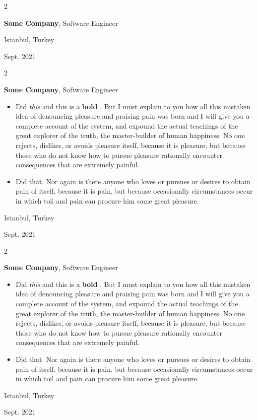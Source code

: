 \documentclass[10pt, letterpaper]{article}
\newenvironment{highlights}{
    \begin{itemize}[
        topsep=0.10 cm,
        parsep=0.10 cm,
        partopsep=0pt,
        itemsep=0pt,
        leftmargin=0.4 cm + 10pt
    ]
}{
    \end{itemize}
} %
\newenvironment{twocolentry}[2][]{
    \onecolentry
    \def\secondColumn{#2}
    \setcolumnwidth{\fill, 4.5 cm}
    \begin{paracol}{2}
}{
    \switchcolumn \raggedleft \secondColumn
    \end{paracol}
    \endonecolentry
} %
\let\hrefWithoutArrow\href
\renewcommand{\href}[2]{\hrefWithoutArrow{#1}{\mbox{\ifthenelse{\equal{#2}{}}{ }{#2 }\raisebox{.15ex}{\footnotesize \faExternalLink*}}}}
\begin{document}
        \vspace{0.2 cm}

        \begin{twocolentry}{
            Istanbul, Turkey

        Sept. 2021
        }
            \textbf{Some \textnormal{Company}}, Software Engineer
        \end{twocolentry}


        \vspace{0.2 cm}

        \begin{twocolentry}{
            Istanbul, Turkey

        Sept. 2021
        }
            \textbf{Some \textnormal{Company}}, Software Engineer
            \begin{highlights}
                \item Did \textit{this} and this is a \textbf{bold} \href{https://example.com}{link}. But I must explain to you how all this mistaken idea of denouncing pleasure and praising pain was born and I will give you a complete account of the system, and expound the actual teachings of the great explorer of the truth, the master-builder of human happiness. No one rejects, dislikes, or avoids pleasure itself, because it is pleasure, but because those who do not know how to pursue pleasure rationally encounter consequences that are extremely painful.
                \item Did that. Nor again is there anyone who loves or pursues or desires to obtain pain of itself, because it is pain, but because occasionally circumstances occur in which toil and pain can procure him some great pleasure.
            \end{highlights}
        \end{twocolentry}


        \vspace{0.2 cm}

        \begin{twocolentry}{
            Istanbul, Turkey

        Sept. 2021
        }
            \textbf{Some \textnormal{Company}}, Software Engineer
            \begin{highlights}
                \item Did \textit{this} and this is a \textbf{bold} \href{https://example.com}{link}. But I must explain to you how all this mistaken idea of denouncing pleasure and praising pain was born and I will give you a complete account of the system, and expound the actual teachings of the great explorer of the truth, the master-builder of human happiness. No one rejects, dislikes, or avoids pleasure itself, because it is pleasure, but because those who do not know how to pursue pleasure rationally encounter consequences that are extremely painful.
                \item Did that. Nor again is there anyone who loves or pursues or desires to obtain pain of itself, because it is pain, but because occasionally circumstances occur in which toil and pain can procure him some great pleasure.
            \end{highlights}
        \end{twocolentry}
\end{document}
